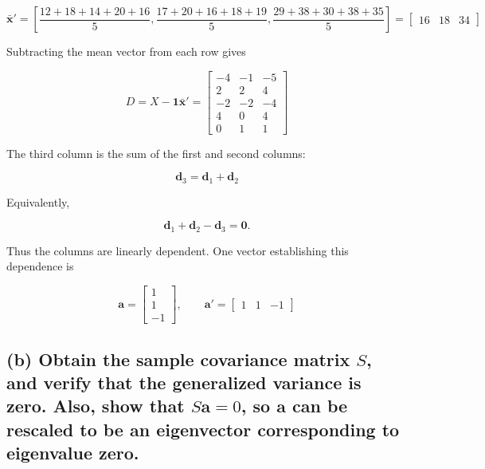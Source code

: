 \documentclass[12pt]{article}
\begin{document}
\[
\bar{\boldsymbol{x}}'
=\left[
\frac{12+18+14+20+16}{5},
\frac{17+20+16+18+19}{5},
\frac{29+38+30+38+35}{5}
\right]
=\begin{bmatrix}16&18&34\end{bmatrix}
\]

\vspace{0.2cm}

Subtracting the mean vector from each row gives

\vspace{0.2cm}

\[
D=X-\boldsymbol{1}\bar{\boldsymbol{x}}'
=\boxed{\begin{bmatrix}
-4&-1&-5\\
2&2&4\\
-2&-2&-4\\
4&0&4\\
0&1&1
\end{bmatrix}}
\]

\vspace{0.2cm}

The third column is the sum of the first and second columns:

\vspace{0.2cm}

\[
\boldsymbol{d}_3=\boldsymbol{d}_1+\boldsymbol{d}_2
\]

\vspace{0.2cm}

Equivalently,

\vspace{0.2cm}

\[
\boldsymbol{d}_1+\boldsymbol{d}_2-\boldsymbol{d}_3=\boldsymbol{0}.
\]

\vspace{0.2cm}

Thus the columns are linearly dependent. One vector establishing this dependence is

\vspace{0.2cm}

\[
\boxed{\boldsymbol{a}=\begin{bmatrix}1\\1\\-1\end{bmatrix},
\qquad
\boldsymbol{a}'=\begin{bmatrix}1&1&-1\end{bmatrix}}
\]

\vspace{0.2cm}

\subsection*{(b) Obtain the sample covariance matrix $S$, and verify that the generalized variance is zero. Also, show that $S\boldsymbol{a}=0$, so $\boldsymbol{a}$ can be rescaled to be an eigenvector corresponding to eigenvalue zero.}
\end{document}
